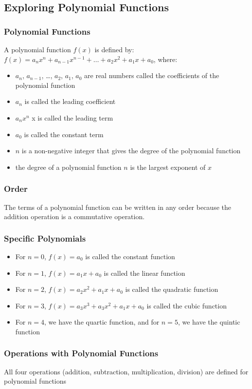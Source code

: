\documentclass{article}
\begin{document}
	\subsection{Exploring Polynomial Functions}
	\subsubsection{Polynomial Functions}
	A polynomial function $f(x)$ is defined by: $f(x) = a_nx^n+a_{n-1}x^{n-1}+\ldots+a_2x^2+a_1x+a_0$, where:
	\begin{itemize}
		\item $a_n$, $a_{n-1}$, \ldots, $a_2$, $a_1$, $a_0$ are real numbers called the coefficients of the polynomial function
		\item $a_n$ is called the leading coefficient
		\item $a_nx^n$ x is called the leading term
		\item $a_0$ is called the constant term
		\item $n$ is a non-negative integer that gives the degree of the polynomial function
		\item the degree of a polynomial function $n$ is the largest exponent of $x$
	\end{itemize}
	\subsubsection{Order}
	The terms of a polynomial function can be written in any order because the addition operation is a commutative operation.
	\subsubsection{Specific Polynomials}
	\begin{itemize}
		\item For $n=0$, $f(x)=a_0$ is called the constant function
		\item For $n=1$, $f(x)=a_1x+a_0$ is called the linear function
		\item For $n=2$, $f(x)=a_2x^2+a_1x+a_0$ is called the quadratic function
		\item For $n=3$, $f(x)=a_3x^3+a_3x^2+a_1x+a_0$ is called the cubic function
		\item For $n=4$, we have the quartic function, and for $n=5$, we have the quintic function
	\end{itemize}
	\subsubsection{Operations with Polynomial Functions}
	All four operations (addition, subtraction, multiplication, division) are defined for polynomial functions
\end{document}
